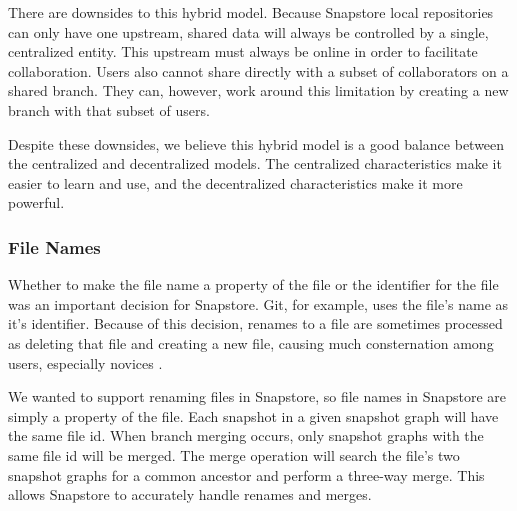 There are downsides to this hybrid model. Because Snapstore local repositories can only have one upstream, shared data will always be controlled by a single, centralized entity. This upstream must always be online in order to facilitate collaboration. Users also cannot share directly with a subset of collaborators on a shared branch. They can, however, work around this limitation by creating a new branch with that subset of users.

Despite these downsides, we believe this hybrid model is a good balance between the centralized and decentralized models. The centralized characteristics make it easier to learn and use, and the decentralized characteristics make it more powerful.

\subsubsection{File Names}

Whether to make the file name a property of the file or the identifier for the file was an important decision for Snapstore. Git, for example, uses the file's name as it's identifier. Because of this decision, renames to a file are sometimes processed as deleting that file and creating a new file, causing much consternation among users, especially novices \cite{RossoJackson}.

We wanted to support renaming files in Snapstore, so file names in Snapstore are simply a property of the file. Each snapshot in a given snapshot graph will have the same file id. When branch merging occurs, only snapshot graphs with the same file id will be merged. The merge operation will search the file's two snapshot graphs for a common ancestor and perform a three-way merge. This allows Snapstore to accurately handle renames and merges.




